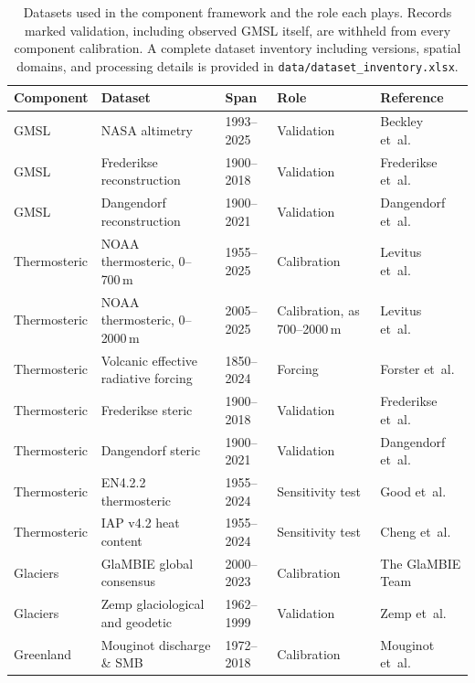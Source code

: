 \documentclass[12pt]{article}
\begin{document}
\begin{landscape}
\begin{table}[!htbp]
\centering
\caption{Datasets used in the component framework and the role each plays. Records marked validation, including observed GMSL itself, are withheld from every component calibration. A complete dataset inventory including versions, spatial domains, and processing details is provided in \texttt{data/dataset\_inventory.xlsx}.}
\label{tab:obs_datasets}
\footnotesize
\setlength{\tabcolsep}{3pt}
\begin{tabular}{lllll}
\toprule
Component & Dataset & Span & Role & Reference \\
\midrule
GMSL & NASA altimetry & 1993--2025 & Validation & Beckley et~al.~\citeyearpar{Beckley2017} \\
GMSL & Frederikse reconstruction & 1900--2018 & Validation & Frederikse et~al.~\citeyearpar{Frederikse2020} \\
GMSL & Dangendorf reconstruction & 1900--2021 & Validation & Dangendorf et~al.~\citeyearpar{Dangendorf2024} \\
\midrule
Thermosteric & NOAA thermosteric, 0--700\,m & 1955--2025 & Calibration & Levitus et~al.~\citeyearpar{Levitus2012} \\
Thermosteric & NOAA thermosteric, 0--2000\,m & 2005--2025 & Calibration, as 700--2000\,m & Levitus et~al.~\citeyearpar{Levitus2012} \\
Thermosteric & Volcanic effective radiative forcing & 1850--2024 & Forcing & Forster et~al.~\citeyearpar{Forster2025} \\
Thermosteric & Frederikse steric & 1900--2018 & Validation & Frederikse et~al.~\citeyearpar{Frederikse2020} \\
Thermosteric & Dangendorf steric & 1900--2021 & Validation & Dangendorf et~al.~\citeyearpar{Dangendorf2024} \\
Thermosteric & EN4.2.2 thermosteric & 1955--2024 & Sensitivity test & Good et~al.~\citeyearpar{Good2013} \\
Thermosteric & IAP v4.2 heat content & 1955--2024 & Sensitivity test & Cheng et~al.~\citeyearpar{Cheng2017} \\
\midrule
Glaciers & GlaMBIE global consensus & 2000--2023 & Calibration & The GlaMBIE Team~\citeyearpar{GlaMBIE2025} \\
Glaciers & Zemp glaciological and geodetic & 1962--1999 & Validation & Zemp et~al.~\citeyearpar{Zemp2019} \\
\midrule
Greenland & Mouginot discharge \& SMB & 1972--2018 & Calibration & Mouginot et~al.~\citeyearpar{Mouginot2019} \\

\end{tabular}
\end{table}
\end{landscape}
\end{document}
